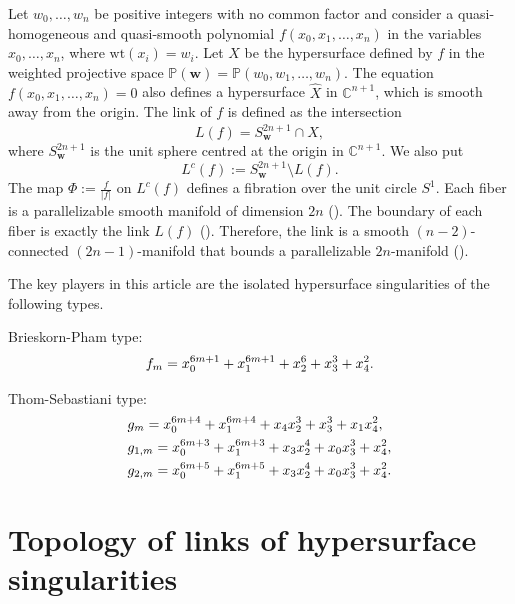 \documentclass[12pt]{amsart}
\theoremstyle{definition}
\theoremstyle{remark}
\begin{document}
Let $w_0,\ldots,w_n$  be positive integers with no common factor and consider 
a quasi-homogeneous and quasi-smooth polynomial
$
f(x_0,x_1,\ldots,x_n)
$
in the variables $x_0,\ldots,x_n$, where $\mathrm{wt}(x_i)=w_i$.
Let $X$ be the hypersurface defined by $f$ in the weighted projective space
$
\mathbb{P}(\mathbf{w})=\mathbb{P}(w_0,w_1,\ldots,w_n)$.
 The equation
$
f(x_0,x_1,\ldots,x_n)=0
$
also defines a hypersurface $\widehat{X}$ in $\mathbb{C}^{n+1}$, which is smooth away from the origin. The link of $f$ is defined as the intersection
\begin{equation}\label{link}
L(f)=S^{2n+1}_\mathbf{w}\cap \widehat{X},
\end{equation}
where $S^{2n+1}_\mathbf{w}$ is the unit sphere centred at the origin in $\mathbb{C}^{n+1}$.
We also put
$$L^c(f):=S^{2n+1}_\mathbf{w}\setminus L(f).$$
 The map $\Phi:=\frac{f}{|f|}$ on $L^c(f)$ defines a fibration over the unit circle $S^1$. Each fiber is a parallelizable smooth manifold of dimension $2n$ (\cite[Theorem~5.1]{M68}). The boundary of each fiber is exactly the link $L(f)$  (\cite[Lemma 6.1]{M68}).
Therefore, the link is a smooth $(n-2)$-connected $(2n-1)$-manifold that bounds a parallelizable $2n$-manifold (\cite[Theorem 5.2]{M68}).

The key players in this article are the isolated hypersurface singularities of the following types. 

Brieskorn-Pham type:
\begin{equation}\label{BP-type}
\aligned
&f_{m}=x_0^{6m+1}+x_1^{6m+1}+x_2^{6}+x_3^{3}+x_4^{2}. \\
\endaligned
\end{equation}

 Thom-Sebastiani type:
 \begin{equation}\label{TS-type}
\aligned
&g_m=x_0^{6m+4}+x_1^{6m+4}+x_4x_2^{3}+x_3^3+x_1x_4^2,\\
&g_{1,m}=x_0^{6m+3}+x_1^{6m+3}+x_3x_2^4+x_0x_3^3+x_4^2,\\
&g_{2,m}=x_0^{6m+5}+x_1^{6m+5}+x_3x_2^4+x_0x_3^3+x_4^2.\\
\endaligned
\end{equation}


 
 
 

 
  \section{Topology of links of hypersurface singularities}\label{section:torsionfree}
 
\end{document}
